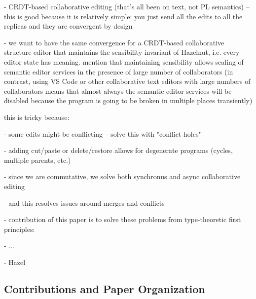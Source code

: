 - CRDT-based collaborative editing (that's all been on text, not PL semantics) -- this is good
because it is relatively simple: you just send all the edits to all the replicas and they are
convergent by design

- we want to have the same convergence for a CRDT-based collaborative structure editor that maintains
the sensibility invariant of Hazelnut, i.e. every editor state has meaning. mention that maintaining sensibility
allows scaling of semantic editor services in the presence of large number of collaborators (in contrast,
using VS Code or other collaborative text editors with large numbers of collaborators means that almost always
the semantic editor services will be disabled because the program is going to be broken in multiple places
transiently)

this is tricky because:

- some edits might be conflicting -- solve this with "conflict holes"

- adding cut/paste or delete/restore allows for degenerate programs (cycles, multiple parents, etc.)

- since we are commutative, we solve both synchronus and async collaborative editing

- and this resolves issues around merges and conflicts

- contribution of this paper is to solve these problems from type-theoretic first principles:

- ...

- Hazel

\subsection{Contributions and Paper Organization}%
\label{sec:Contributions and Paper Organization}
